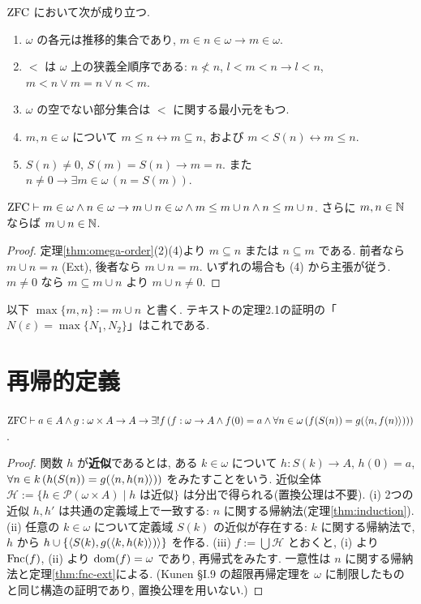 \begin{thm}\label{thm:omega-order}
  $\mathrm{ZFC}$ において次が成り立つ.
  \begin{enumerate}[label=(\arabic*)]
    \item $\omega$ の各元は推移的集合であり, $m \in n \in \omega \to m \in \omega$.
    \item $<$ は $\omega$ 上の狭義全順序である: $n \not< n$, $l < m < n \to l < n$, $m < n \lor m = n \lor n < m$.
    \item $\omega$ の空でない部分集合は $<$ に関する最小元をもつ.
    \item $m, n \in \omega$ について $m \leq n \leftrightarrow m \subseteq n$, および $m < S(n) \leftrightarrow m \leq n$.
    \item $S(n) \neq 0$, \; $S(m) = S(n) \to m = n$. また $n \neq 0 \to \exists m \in \omega\,(n = S(m))$.
  \end{enumerate}
\end{thm}

\begin{lem}[最大値]\label{lem:max}
  $\mathrm{ZFC} \vdash m \in \omega \land n \in \omega \to m \cup n \in \omega \land m \leq m \cup n \land n \leq m \cup n$.
  さらに $m, n \in \mathbb{N}$ ならば $m \cup n \in \mathbb{N}$.
\end{lem}
\begin{proof}
  定理\ref{thm:omega-order}(2)(4)より $m \subseteq n$ または $n \subseteq m$ である. 前者なら $m \cup n = n$ (Ext), 後者なら $m \cup n = m$. いずれの場合も (4) から主張が従う. $m \neq 0$ なら $m \subseteq m \cup n$ より $m \cup n \neq 0$.
\end{proof}

以下 $\max\{m,n\} := m \cup n$ と書く. テキストの定理2.1の証明の「$N(\varepsilon) = \max\{N_1, N_2\}$」はこれである.

\section{再帰的定義}

\begin{thm}\label{thm:recursion-omega}
  $\mathrm{ZFC} \vdash a \in A \land g : \omega \times A \to A \to \exists ! f\,(f : \omega \to A \land f(0) = a \land \forall n \in \omega\,(f(S(n)) = g(\langle n,f(n)\rangle)))$.
\end{thm}
\begin{proof}
  関数 $h$ が\textbf{近似}であるとは, ある $k \in \omega$ について $h : S(k) \to A$, $h(0) = a$, $\forall n \in k\,(h(S(n)) = g(\langle n,h(n)\rangle))$ をみたすことをいう. 近似全体 $\mathcal{H} := \{h \in \mathcal{P}(\omega \times A) \mid h \text{ は近似}\}$ は分出で得られる(置換公理は不要).
  (i) 2つの近似 $h, h'$ は共通の定義域上で一致する: $n$ に関する帰納法(定理\ref{thm:induction}). (ii) 任意の $k \in \omega$ について定義域 $S(k)$ の近似が存在する: $k$ に関する帰納法で, $h$ から $h \cup \{\langle S(k),g(\langle k,h(k)\rangle)\rangle\}$ を作る. (iii) $f := \bigcup \mathcal{H}$ とおくと, (i) より $\mathrm{Fnc}(f)$, (ii) より $\mathrm{dom}(f) = \omega$ であり, 再帰式をみたす. 一意性は $n$ に関する帰納法と定理\ref{thm:fnc-ext}による. (Kunen \cite{kunen2011} \S I.9 の超限再帰定理を $\omega$ に制限したものと同じ構造の証明であり, 置換公理を用いない.)
\end{proof}

